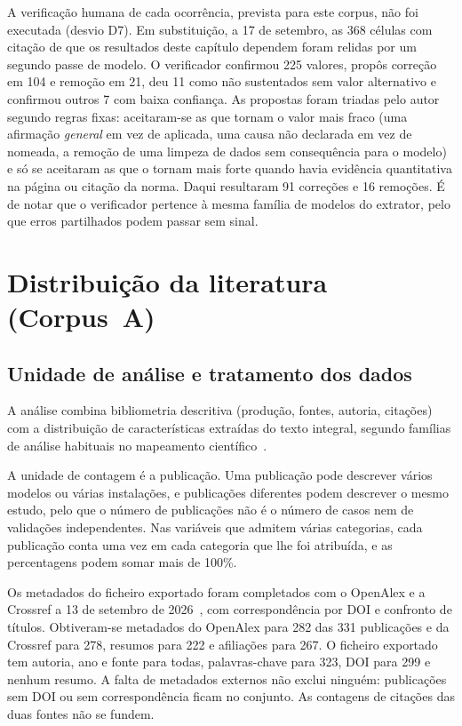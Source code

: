 A verificação humana de cada ocorrência, prevista para este corpus, não foi
executada (desvio D7). Em substituição, a 17 de setembro, as 368 células
com citação de que os resultados deste capítulo dependem foram relidas por
um segundo passe de modelo. O verificador confirmou 225 valores, propôs
correção em 104 e remoção em 21, deu 11 como não sustentados sem valor
alternativo e confirmou outros 7 com baixa confiança. As propostas foram
triadas pelo autor segundo regras fixas: aceitaram-se as que tornam o valor mais
fraco (uma afirmação \emph{general} em vez de aplicada, uma causa não
declarada em vez de nomeada, a remoção de uma limpeza de dados sem
consequência para o modelo) e só se aceitaram as que o tornam mais forte
quando havia evidência quantitativa na página ou citação da norma. Daqui
resultaram 91 correções e 16 remoções. É de notar que o verificador pertence à
mesma família de modelos do extrator, pelo que erros partilhados podem
passar sem sinal. 

\section{Distribuição da literatura (Corpus~A)}
\label{sec:corpus-a}

\subsection{Unidade de análise e tratamento dos dados}

A análise combina bibliometria descritiva (produção, fontes, autoria,
citações) com a distribuição de características extraídas do texto integral,
segundo famílias de análise habituais no mapeamento
científico~\cite{Aria2017Bibliometrix,VanEck2010VOSviewer}. 

A unidade de contagem é a publicação. Uma publicação pode descrever vários
modelos ou várias instalações, e publicações diferentes podem descrever o
mesmo estudo, pelo que o número de publicações não é o número de casos nem
de validações independentes. Nas variáveis que admitem várias categorias,
cada publicação conta uma vez em cada categoria que lhe foi atribuída, e as
percentagens podem somar mais de 100\%. 

Os metadados do ficheiro exportado foram completados com o OpenAlex e a
Crossref a 13 de setembro de 2026~\cite{Priem2022OpenAlex,Crossref2026API},
com correspondência por DOI e confronto de títulos. Obtiveram-se metadados
do OpenAlex para 282 das 331 publicações e da Crossref para 278, resumos
para 222 e afiliações para 267. O ficheiro exportado tem autoria, ano e
fonte para todas, palavras-chave para 323, DOI para 299 e nenhum resumo.
A falta de metadados externos não exclui ninguém: publicações sem DOI ou
sem correspondência ficam no conjunto. As contagens de citações das duas
fontes não se fundem.

